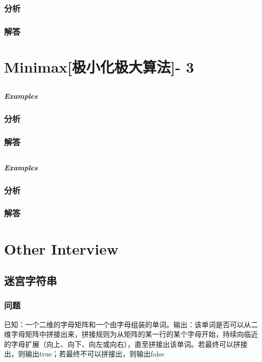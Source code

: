 \documentclass[UTF8,a4paper,12pt]{ctexbook}
\begin{document}
		\subsubsection{分析}
	
		\subsubsection{解答}
		
\section{Minimax[极小化极大算法]- 3}
	\subsection{}
	
		\subparagraph{Examples}
		
		\subsubsection{分析}
		
		\subsubsection{解答}
	\subsection{}
		
		\subparagraph{Examples}
		
		\subsubsection{分析}
		
		\subsubsection{解答}

\section{Other Interview}
\subsection{迷宫字符串} 
	\subsubsection{问题}
	已知：一个二维的字母矩阵和一个由字母组装的单词。输出：该单词是否可以从二维字母矩阵中拼接出来，拼接规则为从矩阵的某一行的某个字母开始，持续向临近的字母扩展（向上、向下、向左或向右），直至拼接出该单词。若最终可以拼接出，则输出true；若最终不可以拼接出，则输出false
	
\end{document}
